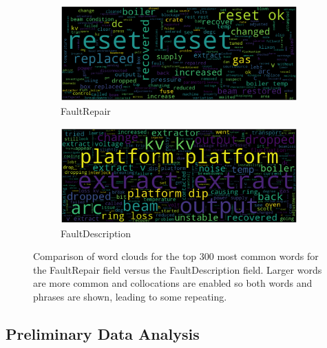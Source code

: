 \documentclass[10pt,oneside]{report}
\begin{document}
\begin{figure}[htbp]
    \centering
    \begin{subfigure}[b]{0.48\textwidth}
        \centering
        \includegraphics[width=\textwidth]{wcFaultRepairs.png}
        \caption{FaultRepair}
        \label{fig:wcFaultRepairs}
    \end{subfigure}%
    \hfill
    \begin{subfigure}[b]{0.48\textwidth}
        \centering
        \includegraphics[width=\textwidth]{wcFaultDescription.png}
        \caption{FaultDescription}
        \label{fig:wcFaultDescription}
    \end{subfigure}
    \caption{Comparison of word clouds for the top 300 most common words for the FaultRepair field versus the FaultDescription field. Larger words are more common and collocations are enabled so both words and phrases are shown, leading to some repeating.}
    \label{fig:wc}
\end{figure}

\subsection{Preliminary Data Analysis}
\end{document}
